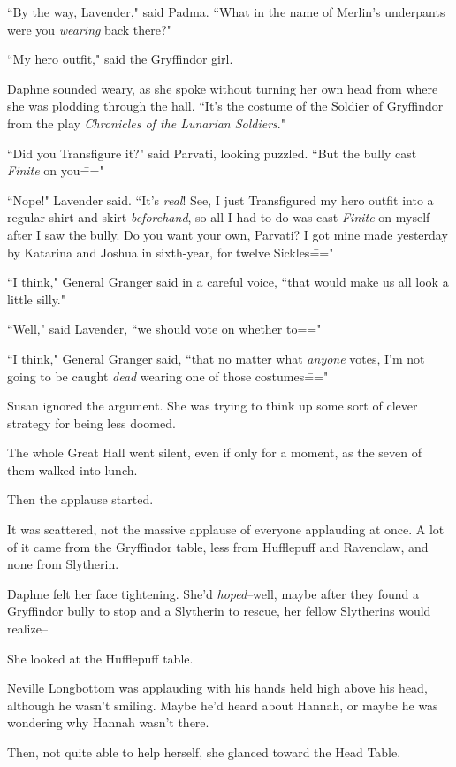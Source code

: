 ``By the way, Lavender," said Padma. ``What in the name of Merlin's underpants were you \emph{wearing} back there?"

``My hero outfit," said the Gryffindor girl.

Daphne sounded weary, as she spoke without turning her own head from where she was plodding through the hall. ``It's the costume of the Soldier of Gryffindor from the play \emph{Chronicles of the Lunarian Soldiers}."

``Did you Transfigure it?" said Parvati, looking puzzled. ``But the bully cast \emph{Finite} on you\==="

``Nope!" Lavender said. ``It's \emph{real}! See, I just Transfigured my hero outfit into a regular shirt and skirt \emph{beforehand}, so all I had to do was cast \emph{Finite} on myself after I saw the bully. Do you want your own, Parvati? I got mine made yesterday by Katarina and Joshua in sixth-year, for twelve Sickles\==="

``I think," General Granger said in a careful voice, ``that would make us all look a little silly."

``Well," said Lavender, ``we should vote on whether to\==="

``I think," General Granger said, ``that no matter what \emph{anyone} votes, I'm not going to be caught \emph{dead} wearing one of those costumes\==="

Susan ignored the argument. She was trying to think up some sort of clever strategy for being less doomed.

\later

The whole Great Hall went silent, even if only for a moment, as the seven of them walked into lunch.

Then the applause started.

It was scattered, not the massive applause of everyone applauding at once. A lot of it came from the Gryffindor table, less from Hufflepuff and Ravenclaw, and none from Slytherin.

Daphne felt her face tightening. She'd \emph{hoped}\---well, maybe after they found a Gryffindor bully to stop and a Slytherin to rescue, her fellow Slytherins would realize\---

She looked at the Hufflepuff table.

Neville Longbottom was applauding with his hands held high above his head, although he wasn't smiling. Maybe he'd heard about Hannah, or maybe he was wondering why Hannah wasn't there.

Then, not quite able to help herself, she glanced toward the Head Table.

